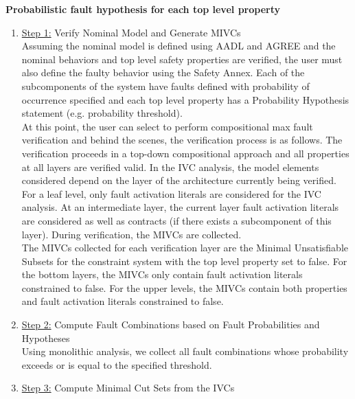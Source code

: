 \textbf{Probabilistic fault hypothesis for each top level property}
\begin{enumerate}[label=(\roman*)]
\item \underline{Step 1:} Verify Nominal Model and Generate MIVCs \\

Assuming the nominal model is defined using AADL and AGREE and the nominal behaviors and top level safety properties are verified, the user must also define the faulty behavior using the Safety Annex. Each of the subcomponents of the system have faults defined with probability of occurrence specified and each top level property has a Probability Hypothesis statement (e.g. probability threshold). \\

At this point, the user can select to perform compositional max fault verification and behind the scenes, the verification process is as follows. The verification proceeds in a top-down compositional approach and all properties at all layers are verified valid. In the IVC analysis, the model elements considered depend on the layer of the architecture currently being verified. For a leaf level, only fault activation literals are considered for the IVC analysis. At an intermediate layer, the current layer fault activation literals are considered as well as contracts (if there exists a subcomponent of this layer). During verification, the MIVCs are collected.  \\

The MIVCs collected for each verification layer are the Minimal Unsatisfiable Subsets for the constraint system with the top level property set to false. For the bottom layers, the MIVCs only contain fault activation literals constrained to false. For the upper levels, the MIVCs contain both properties and fault activation literals constrained to false. \\

\item \underline{Step 2:} Compute Fault Combinations based on Fault Probabilities and Hypotheses \\

Using monolithic analysis, we collect all fault combinations whose probability exceeds or is equal to the specified threshold. \\

\item \underline{Step 3:} Compute Minimal Cut Sets from the IVCs \\


\end{enumerate}
